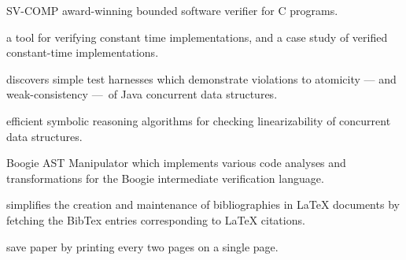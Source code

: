 \documentclass{article}
\begin{document}
  \begin{description}[leftmargin=0cm]

    \item[\href{%
    https://github.com/smackers/smack}{%
    SMACK},] SV-COMP award-winning bounded software verifier for C programs.



    \item[\href{%
    https://github.com/imdea-software/verifying-constant-time}{%
    ct-verif},] a tool for verifying constant time implementations, and a case study of verified constant-time implementations.



    \item[\href{%
    https://github.com/michael-emmi/violat}{%
    Violat},] discovers simple test harnesses which demonstrate violations to atomicity — and weak-consistency — of Java concurrent data structures.



    \item[\href{%
    https://github.com/imdea-software/violin}{%
    Violin},] efficient symbolic reasoning algorithms for checking linearizability of concurrent data structures.



    \item[\href{%
    https://github.com/michael-emmi/bam-bam-boogieman}{%
    BAM! BAM! Boogieman},] Boogie AST Manipulator which implements various code analyses and transformations for the Boogie intermediate verification language.



    \item[\href{%
    https://github.com/michael-emmi/bibly}{%
    Bibly},] simplifies the creation and maintenance of bibliographies in LaTeX documents by fetching the BibTex entries corresponding to LaTeX citations.



    \item[\href{%
    https://github.com/michael-emmi/2up}{%
    2up},] save paper by printing every two pages on a single page.


  \end{description}
\end{document}
